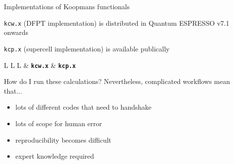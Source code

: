 \documentclass[xcolor=table,aspectratio=169]{beamer}
\numberwithin{equation}{section}
\begin{document}
\begin{frame}{Implementations of Koopmans functionals}

   \texttt{kcw.x} (DFPT implementation) is distributed in Quantum ESPRESSO v7.1 onwards

   \vspace{2ex}

   \texttt{kcp.x} (supercell implementation) is available publically

   \vspace{2ex}
   \small
   \renewcommand{\arraystretch}{1.5}
   \begin{tabularx}{\columnwidth}{L L L}
                                   & \textbf{\texttt{kcw.x}}                                                       & \textbf{\texttt{kcp.x}}                                                                                                          
   \end{tabularx}
   
\end{frame}

\begin{frame}{How do I run these calculations?}
   Nevertheless, complicated workflows mean that...
   \begin{itemize}[<+(1)->]
      \item lots of different codes that need to handshake
      \item lots of scope for human error
      \item reproducibility becomes difficult
      \item expert knowledge required
   \end{itemize}


\end{frame}
\end{document}
